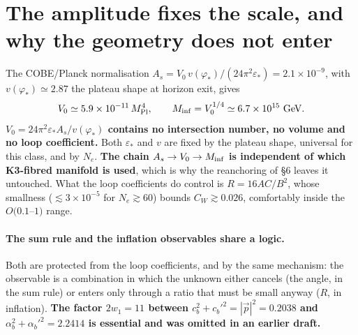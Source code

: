 \section{The amplitude fixes the scale, and why the geometry does not enter}
The COBE/Planck normalisation $A_s=V_0\,v(\varphi_*)/(24\pi^2\varepsilon_*)=2.1\times10^{-9}$, with $v(\varphi_*)\simeq2.87$ the plateau shape at horizon exit, gives
\begin{equation}
V_0\simeq5.9\times10^{-11}\,M_{\rm Pl}^4,\qquad M_{\rm inf}=V_0^{1/4}\simeq6.7\times10^{15}~\text{GeV}.
\end{equation}
\textbf{$V_0=24\pi^2\varepsilon_*A_s/v(\varphi_*)$ contains no intersection number, no volume and no loop coefficient.} Both $\varepsilon_*$ and $v$ are fixed by the plateau shape, universal for this class, and by $N_e$. \textbf{The chain $A_s\to V_0\to M_{\rm inf}$ is independent of which K3-fibred manifold is used}, which is why the reanchoring of \S6 leaves it untouched. What the loop coefficients do control is $R=16AC/B^2$, whose smallness ($\lesssim3\times10^{-5}$ for $N_e\gtrsim60$) bounds $C_W\gtrsim0.026$, comfortably inside the $O(0.1$--$1)$ range.

\paragraph{The sum rule and the inflation observables share a logic.} Both are protected from the loop coefficients, and by the same mechanism: the observable is a combination in which the unknown either cancels (the angle, in the sum rule) or enters only through a ratio that must be small anyway ($R$, in inflation). \textbf{The factor $2w_1=11$ between $c_b^2+c_b'^2=|\vec p|^2=0.2038$ and $\alpha_b^2+\alpha_b'^2=2.2414$ is essential and was omitted in an earlier draft.}

